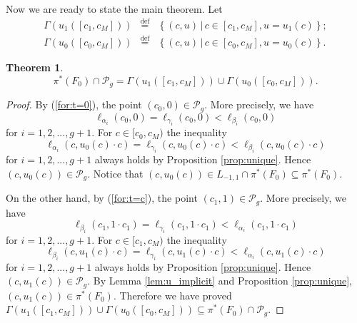 \documentclass[UTF8]{amsart}
\newtheorem{theorem}{Theorem}[section]
\numberwithin{equation}{section}
\theoremstyle{definition}
\theoremstyle{example}
\theoremstyle{remark}
\begin{document}
Now we are ready to state the main theorem. 
Let 
\begin{eqnarray*}
 \Gamma(u_1([c_1,c_{M}])) &\overset{\mathrm{def}}{=}& \left\{ (c, u )\,|\, c\in [c_1,c_{M}], u = u_1(c) \right\}; \\
 \Gamma(u_0([c_0,c_{M}])) &\overset{\mathrm{def}}{=}& \left\{ (c, u )\,|\, c\in [c_0,c_{M}], u= u_0(c)\right\}.
\end{eqnarray*}
\begin{theorem}
 \[
  \pi^{*}(F_0) \cap \mathcal{P}_g = \Gamma(u_1([c_1, c_M]))\cup \Gamma(u_0([c_0, c_M])). 
 \]
 \label{thm:main}
\end{theorem}
\begin{proof}
 By (\ref{for:t=0}), the point $(c_0,0) \in \mathcal{P}_g$. More precisely, we have
 \[
  \ell_{\alpha_i}(c_0,0) = \ell_{\gamma_i}(c_0,0) < \ell_{\beta_i}(c_0,0)
 \]
 for $i =1,2,..., g+1$. 
 For $c \in [c_0,c_M)$ the inequality 
 \[
  \ell_{\alpha_i}(c, u_0(c)\cdot c) = \ell_{\gamma_i}(c,u_0(c)\cdot c) < \ell_{\beta_i}(c,u_0(c)\cdot c)
 \]
 for $i =1,2,..., g+1$ 
 always holds by Proposition \ref{prop:unique}. Hence $(c,u_0(c)) \in \mathcal{P}_g$. Notice that $(c,u_0(c))\in L_{-1,1}\cap \pi^{*}(F_0) \subseteq \pi^{*}(F_0)$. 

 On the other hand, by (\ref{for:t=c}), the point $(c_1,1) \in \mathcal{P}_g$. More precisely, we have
 \[
  \ell_{\beta_i}(c_1,1\cdot c_1) = \ell_{\gamma_i}(c_1,1\cdot c_1) < \ell_{\alpha_i}(c_1,1\cdot c_1)
 \]
 for $i =1,2,..., g+1$. 
 For $c \in [c_1,c_M)$ the inequality 
 \[
  \ell_{\beta_i}(c,u_1(c)\cdot c) = \ell_{\gamma_i}(c,u_1(c)\cdot c) < \ell_{\alpha_i}(c,u_1(c)\cdot c)
 \]
 for $i =1,2,..., g+1$
 always holds by Proposition \ref{prop:unique}. Hence $(c,u_1(c)) \in \mathcal{P}_g$. By Lemma \ref{lem:u_implicit} and Proposition \ref{prop:unique}, $(c,u_1(c)) \in \pi^{*}(F_0)$. 
 Therefore we have proved $\Gamma(u_1([c_1, c_M]))\cup \Gamma(u_0([c_0, c_M])) \subseteq  \pi^{*}(F_0) \cap \mathcal{P}_g$. 


\end{proof}
\end{document}
